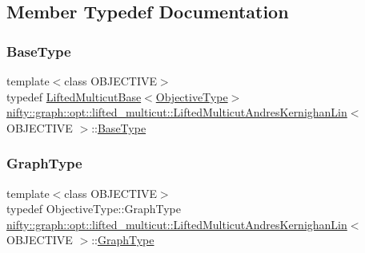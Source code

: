 \subsection{Member Typedef Documentation}
\mbox{\label{classnifty_1_1graph_1_1opt_1_1lifted__multicut_1_1LiftedMulticutAndresKernighanLin_af7916e019d2d26a408f8802b4f381c41}} 
\subsubsection{\texorpdfstring{Base\+Type}{BaseType}}
{\footnotesize\ttfamily template$<$class O\+B\+J\+E\+C\+T\+I\+VE$>$ \\
typedef \hyperlink{classnifty_1_1graph_1_1opt_1_1lifted__multicut_1_1LiftedMulticutBase}{Lifted\+Multicut\+Base}$<$\hyperlink{classnifty_1_1graph_1_1opt_1_1lifted__multicut_1_1LiftedMulticutAndresKernighanLin_a31b45ec18fa430d4f6231a60395b4b14}{Objective\+Type}$>$ \hyperlink{classnifty_1_1graph_1_1opt_1_1lifted__multicut_1_1LiftedMulticutAndresKernighanLin}{nifty\+::graph\+::opt\+::lifted\+\_\+multicut\+::\+Lifted\+Multicut\+Andres\+Kernighan\+Lin}$<$ O\+B\+J\+E\+C\+T\+I\+VE $>$\+::\hyperlink{classnifty_1_1graph_1_1opt_1_1lifted__multicut_1_1LiftedMulticutAndresKernighanLin_af7916e019d2d26a408f8802b4f381c41}{Base\+Type}}

\mbox{\label{classnifty_1_1graph_1_1opt_1_1lifted__multicut_1_1LiftedMulticutAndresKernighanLin_a0554f7c914a8ee2889c43a103be35397}} 
\subsubsection{\texorpdfstring{Graph\+Type}{GraphType}}
{\footnotesize\ttfamily template$<$class O\+B\+J\+E\+C\+T\+I\+VE$>$ \\
typedef Objective\+Type\+::\+Graph\+Type \hyperlink{classnifty_1_1graph_1_1opt_1_1lifted__multicut_1_1LiftedMulticutAndresKernighanLin}{nifty\+::graph\+::opt\+::lifted\+\_\+multicut\+::\+Lifted\+Multicut\+Andres\+Kernighan\+Lin}$<$ O\+B\+J\+E\+C\+T\+I\+VE $>$\+::\hyperlink{classnifty_1_1graph_1_1opt_1_1lifted__multicut_1_1LiftedMulticutAndresKernighanLin_a0554f7c914a8ee2889c43a103be35397}{Graph\+Type}}

